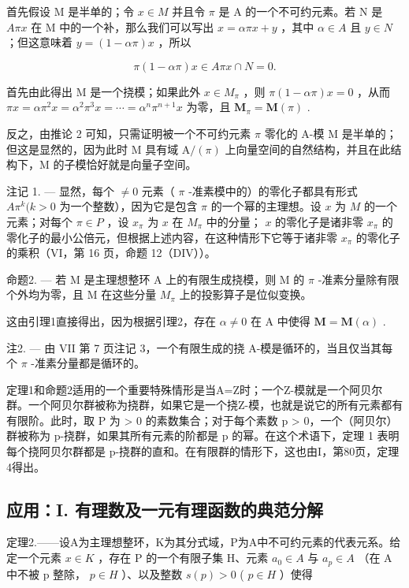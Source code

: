 首先假设 M 是半单的；令 \(x \in M\) 并且令 \(\pi\) 是 A 的一个不可约元素。若 N 是 \(A\pi x\) 在 M 中的一个补，那么我们可以写出 \(x = \alpha\pi x + y\) ，其中 \(\alpha \in A\) 且 \(y \in N\) ；但这意味着 \(y = (1 - \alpha\pi)x\) ，所以

\[
\pi (1 - \alpha \pi) x \in A \pi x \cap N = 0.
\]

首先由此得出 M 是一个挠模；如果此外 \(x \in M_{\pi}\) ，则 \(\pi(1 - \alpha\pi)x = 0\) ，从而 \(\pi x = \alpha\pi^{2}x = \alpha^{2}\pi^{3}x = \cdots = \alpha^{n}\pi^{n+1}x\) 为零，且 \(\mathbf{M}_{\pi} = \mathbf{M}(\pi)\) .

反之，由推论 2 可知，只需证明被一个不可约元素 \(\pi\) 零化的 A-模 M 是半单的；但这是显然的，因为此时 M 具有域 \(\mathrm{A}/(\pi)\) 上向量空间的自然结构，并且在此结构下，M 的子模恰好就是向量子空间。

注记 1. --- 显然，每个 \(\neq 0\) 元素（ \(\pi\) -准素模中的）的零化子都具有形式 \(A\pi^k (k > 0\) 为一个整数），因为它是包含 \(\pi\) 的一个幂的主理想。设 \(x\) 为 \(M\) 的一个元素；对每个 \(\pi \in P\) ，设 \(x_{\pi}\) 为 \(x\) 在 \(M_{\pi}\) 中的分量； \(x\) 的零化子是诸非零 \(x_{\pi}\) 的零化子的最小公倍元，但根据上述内容，在这种情形下它等于诸非零 \(x_{\pi}\) 的零化子的乘积（VI，第 16 页，命题 12（DIV））。

命题2. --- 若 M 是主理想整环 A 上的有限生成挠模，则 M 的 \(\pi\) -准素分量除有限个外均为零，且 M 在这些分量 \(M_{\pi}\) 上的投影算子是位似变换。

这由引理1直接得出，因为根据引理2，存在 \(\alpha \neq 0\) 在 A 中使得 \(\mathbf{M} = \mathbf{M}(\alpha)\) .

注2. --- 由 VII 第 7 页注记 3，一个有限生成的挠 A-模是循环的，当且仅当其每个 \(\pi\) -准素分量都是循环的。

定理1和命题2适用的一个重要特殊情形是当A=Z时；一个Z-模就是一个阿贝尔群。一个阿贝尔群被称为挠群，如果它是一个挠Z-模，也就是说它的所有元素都有有限阶。此时，取 P 为 \textgreater{} 0 的素数集合；对于每个素数 p \textgreater{} 0，一个（阿贝尔）群被称为 p-挠群，如果其所有元素的阶都是 p 的幂。在这个术语下，定理 1 表明每个挠阿贝尔群都是 p-挠群的直和。在有限群的情形下，这也由I，第80页，定理4得出。

\subsection{应用：I. 有理数及一元有理函数的典范分解}

定理2.——设A为主理想整环，K为其分式域，P为A中不可约元素的代表元系。给定一个元素 \(x \in K\) ，存在 P 的一个有限子集 H、元素 \(a_{0} \in A\) 与 \(a_{p} \in A\) （在 A 中不被 p 整除， \(p \in H\) ）、以及整数 \(s(p) > 0\) ( \(p \in H\) ）使得

